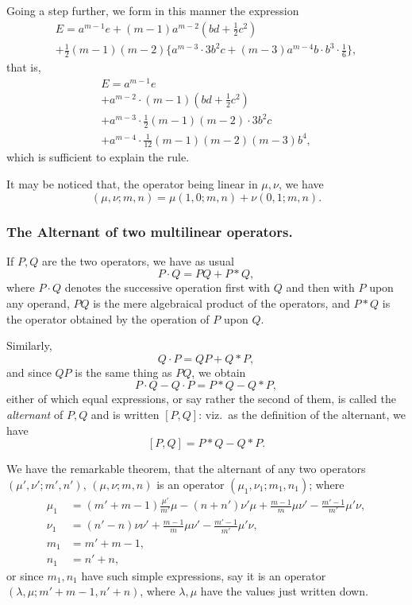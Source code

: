 \documentclass[11pt,a4paper]{book}
\begin{document}
{{{\newpage
\noindent Going a step further, we form in this manner the expression
\begin{multline*}
E = a^{m-1}e + (m-1)a^{m-2}(bd + \tfrac{1}{2}c^2) \\
+ \tfrac{1}{2}(m-1)(m-2)\{a^{m-3} \cdot 3b^2c + (m-3)a^{m-4}b \cdot b^3 \cdot \tfrac{1}{6}\},
\end{multline*}
that is,
\begin{multline*}
E = a^{m-1}e \\
+ a^{m-2} \cdot (m-1)(bd + \tfrac{1}{2}c^2) \\
+ a^{m-3} \cdot \tfrac{1}{2}(m-1)(m-2) \cdot 3b^2c \\
+ a^{m-4} \cdot \tfrac{1}{12}(m-1)(m-2)(m-3)b^4,
\end{multline*}
which is sufficient to explain the rule.

It may be noticed that, the operator being linear in $\mu, \nu$, we have
\[
(\mu, \nu; m, n) = \mu(1, 0; m, n) + \nu(0, 1; m, n).
\]

\subsubsection*{The Alternant of two multilinear operators.}

If $P, Q$ are the two operators, we have as usual
\[
P \cdot Q = PQ + P * Q,
\]
where $P \cdot Q$ denotes the successive operation first with $Q$ and then with $P$ upon any
operand, $PQ$ is the mere algebraical product of the operators, and $P * Q$ is the operator
obtained by the operation of $P$ upon $Q$.

Similarly,
\[
Q \cdot P = QP + Q * P,
\]
and since $QP$ is the same thing as $PQ$, we obtain
\[
P \cdot Q - Q \cdot P = P * Q - Q * P,
\]
either of which equal expressions, or say rather the second of them, is called the
\textit{alternant} of $P, Q$ and is written $[P, Q]$: viz.\ as the definition of the alternant, we have
\[
[P, Q] = P * Q - Q * P.
\]

We have the remarkable theorem, that the alternant of any two operators $(\mu', \nu'; m', n')$,
$(\mu, \nu; m, n)$ is an operator $(\mu_1, \nu_1; m_1, n_1)$; where
\begin{align*}
\mu_1 &= (m' + m - 1)\frac{\mu'}{m'}\mu - (n + n')\nu'\mu + \frac{m - 1}{m}\mu\nu' - \frac{m' - 1}{m'}\mu'\nu, \\
\nu_1 &= (n' - n)\nu\nu' + \frac{m - 1}{m}\mu\nu' - \frac{m' - 1}{m'}\mu'\nu, \\
m_1 &= m' + m - 1, \\
n_1 &= n' + n,
\end{align*}
or since $m_1, n_1$ have such simple expressions, say it is an operator $(\lambda, \mu; m' + m - 1, n' + n)$,
where $\lambda, \mu$ have the values just written down.

}}}
\end{document}
